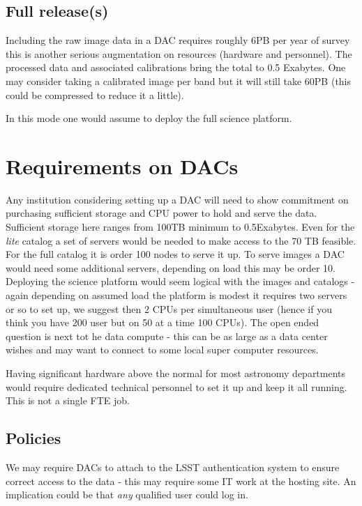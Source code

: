 \subsection{Full release(s)}
Including the raw image data in a DAC requires roughly 6PB per year of survey this is another serious augmentation on resources (hardware and personnel). The processed data and associated calibrations bring the total  to 0.5 Exabytes.  One may consider taking a  calibrated image per band
but it will still take 60PB (this could be compressed to reduce it a little).

In this mode one would assume to deploy the full science platform.


\section{Requirements on DACs}
Any institution considering setting up a DAC will need to show commitment on purchasing sufficient storage and CPU power to hold and serve the data.
Sufficient storage here ranges from 100TB minimum to 0.5Exabytes.  Even for the \emph{lite} catalog a set of servers would be needed to make access to the 70 TB feasible. For the full catalog it is order 100 nodes to serve it up.   To serve images a DAC would need some additional servers, depending on load this may be order 10.
Deploying the science platform would seem logical with the images and catalogs - again depending on assumed load the platform is modest it requires two servers or so to set up, we suggest then 2 CPUs per simultaneous user (hence if you think you have 200 user but on 50 at a time 100 CPUs).
The open ended question is next tot he data compute - this can be as large as a data center wishes and may want to connect to some local super computer resources.

Having significant hardware above the normal for most astronomy departments would require dedicated technical personnel to set it up and keep it all running. This is not a single FTE job.

\subsection{Policies}
We may require DACs to attach to the LSST authentication system to ensure correct access to the data - this may require some IT work at the hosting site. An implication could be that {\em any } qualified user could log in.

